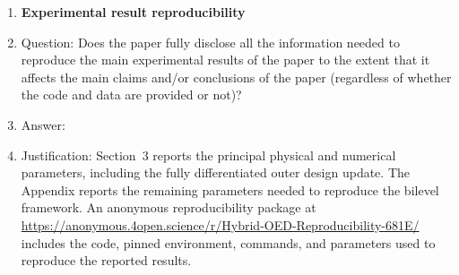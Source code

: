 \begin{enumerate}
\item {\bf Experimental result reproducibility}
    \item[] Question: Does the paper fully disclose all the information needed to reproduce the main experimental results of the paper to the extent that it affects the main claims and/or conclusions of the paper (regardless of whether the code and data are provided or not)?
    \item[] Answer: \answerYes{}
    \item[] Justification: Section~3 reports the principal physical and numerical
    parameters, including the fully differentiated outer design update. The
    Appendix reports the remaining parameters needed to reproduce the bilevel
    framework. An anonymous reproducibility package at
    \url{https://anonymous.4open.science/r/Hybrid-OED-Reproducibility-681E/}
    includes the code, pinned environment, commands, and parameters used to
    reproduce the reported results.

\end{enumerate}
